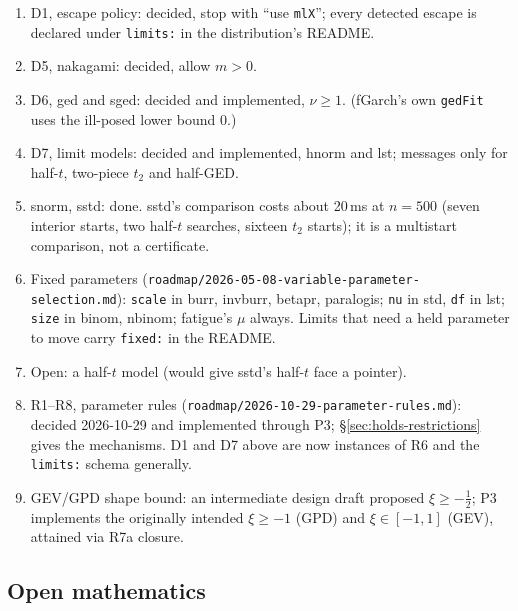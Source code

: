 \documentclass[11pt]{article}
\newcommand{\code}[1]{\texttt{#1}}
\theoremstyle{plain}
\theoremstyle{definition}
\theoremstyle{remark}
\begin{document}
\begin{enumerate}
  \item D1, escape policy: decided, stop with ``use \code{mlX}''; every
    detected escape is declared under \code{limits:} in the distribution's
    README.
  \item D5, nakagami: decided, allow $m > 0$.
  \item D6, ged and sged: decided and implemented, $\nu \ge 1$. (fGarch's
    own \code{gedFit} uses the ill-posed lower bound $0$.)
  \item D7, limit models: decided and implemented, hnorm and lst; messages
    only for half-$t$, two-piece $t_2$ and half-GED.
  \item snorm, sstd: done. sstd's comparison costs about 20\,ms at
    $n = 500$ (seven interior starts, two half-$t$ searches, sixteen $t_2$
    starts); it is a multistart comparison, not a certificate.
  \item Fixed parameters (\code{roadmap/2026-05-08-variable-parameter-selection.md}):
    \code{scale} in burr, invburr, betapr, paralogis; \code{nu} in std,
    \code{df} in lst; \code{size} in binom, nbinom; fatigue's $\mu$ always.
    Limits that need a held parameter to move carry \code{fixed:} in the
    README.
  \item Open: a half-$t$ model (would give sstd's half-$t$ face a pointer).
  \item R1--R8, parameter rules (\code{roadmap/2026-10-29-parameter-rules.md}):
    decided 2026-10-29 and implemented through P3; \S\ref{sec:holds-restrictions}
    gives the mechanisms. D1 and D7 above are now instances of R6 and the
    \code{limits:} schema generally.
  \item GEV/GPD shape bound: an intermediate design draft proposed
    $\xi\ge-\tfrac12$; P3 implements the originally intended $\xi\ge-1$
    (GPD) and $\xi\in[-1,1]$ (GEV), attained via R7a closure.
\end{enumerate}

\subsection*{Open mathematics}
\end{document}
